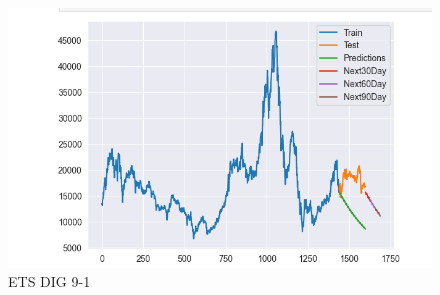 \documentclass[conference]{IEEEtran}
\begin{document}
\begin{figure}[htbp]
\begin{minipage}{0.23\textwidth}
    \includegraphics[width=1\textwidth]{experiment/ets/TEAM4_ETS_DIG_9_1.png}
    \caption{ETS DIG 9-1}
    \label{fig:nvl_histogram}
    \end{minipage}

    \vspace{0.5cm} %


\end{figure}
\end{document}
